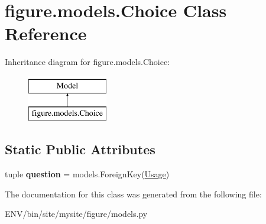 \hypertarget{classfigure_1_1models_1_1Choice}{\section{figure.\-models.\-Choice Class Reference}
\label{classfigure_1_1models_1_1Choice}
}
Inheritance diagram for figure.\-models.\-Choice\-:\begin{figure}[H]
\begin{center}
\leavevmode
\includegraphics[height=2.000000cm]{classfigure_1_1models_1_1Choice}
\end{center}
\end{figure}
\subsection*{Static Public Attributes}
\begin{DoxyCompactItemize}
\item 
\hypertarget{classfigure_1_1models_1_1Choice_ab56eaa9f5c16b7ca7b02cf249853e12b}{tuple {\bfseries question} = models.\-Foreign\-Key(\hyperlink{classfigure_1_1models_1_1Usage}{Usage})}\label{classfigure_1_1models_1_1Choice_ab56eaa9f5c16b7ca7b02cf249853e12b}

\end{DoxyCompactItemize}


The documentation for this class was generated from the following file\-:\begin{DoxyCompactItemize}
\item 
E\-N\-V/bin/site/mysite/figure/models.\-py\end{DoxyCompactItemize}
